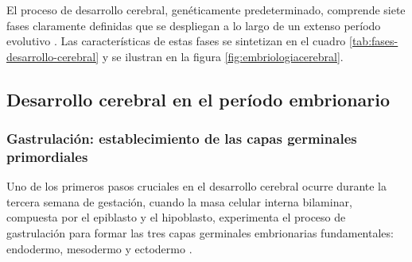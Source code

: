 El proceso de desarrollo cerebral, genéticamente predeterminado, comprende
siete fases claramente definidas que se despliegan a lo largo de un extenso
período evolutivo \cite{Kolb7}. Las características de estas fases se
sintetizan en el cuadro \ref{tab:fases-desarrollo-cerebral} y se ilustran en la
figura \ref{fig:embriologiacerebral}. 

\begin{table}[htbp]
\caption{Siete fases del desarrollo cerebral}
\label{tab:fases-desarrollo-cerebral}
\end{table}

\subsection{Desarrollo cerebral en el período embrionario}
\subsubsection{Gastrulación: establecimiento de las capas germinales primordiales}
Uno de los primeros pasos cruciales en el desarrollo cerebral ocurre durante la
tercera semana de gestación, cuando la masa celular interna bilaminar,
compuesta por el epiblasto y el hipoblasto, experimenta el proceso de
gastrulación para formar las tres capas germinales embrionarias fundamentales:
endodermo, mesodermo y ectodermo \cite{Polin124}.

